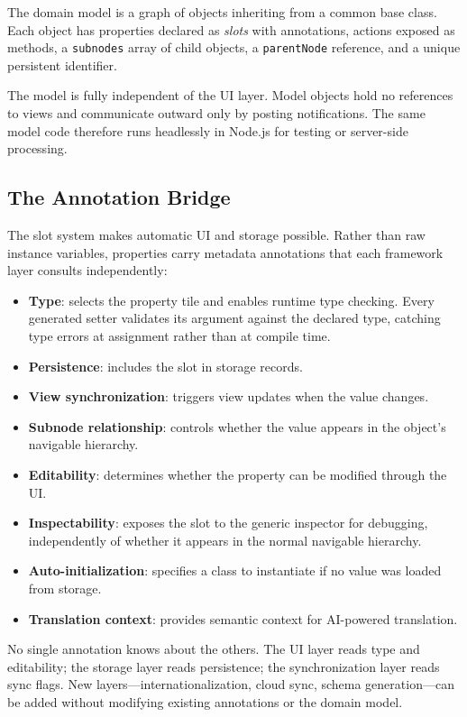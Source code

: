 \documentclass[sigplan,review,anonymous,10pt]{acmart}
\begin{document}
The domain model is a graph of objects inheriting from a common base class. Each object has properties declared as \emph{slots} with annotations, actions exposed as methods, a \texttt{subnodes} array of child objects, a \texttt{parentNode} reference, and a unique persistent identifier.

The model is fully independent of the UI layer. Model objects hold no references to views and communicate outward only by posting notifications. The same model code therefore runs headlessly in Node.js for testing or server-side processing.

\subsection{The Annotation Bridge}
\label{sec:annotation-bridge}

The slot system makes automatic UI and storage possible. Rather than raw instance variables, properties carry metadata annotations that each framework layer consults independently:

\begin{itemize}
\item \textbf{Type}: selects the property tile and enables runtime type checking. Every generated setter validates its argument against the declared type, catching type errors at assignment rather than at compile time.
\item \textbf{Persistence}: includes the slot in storage records.
\item \textbf{View synchronization}: triggers view updates when the value changes.
\item \textbf{Subnode relationship}: controls whether the value appears in the object's navigable hierarchy.
\item \textbf{Editability}: determines whether the property can be modified through the UI.
\item \textbf{Inspectability}: exposes the slot to the generic inspector for debugging, independently of whether it appears in the normal navigable hierarchy.
\item \textbf{Auto-initialization}: specifies a class to instantiate if no value was loaded from storage.
\item \textbf{Translation context}: provides semantic context for AI-powered translation.
\end{itemize}

No single annotation knows about the others. The UI layer reads type and editability; the storage layer reads persistence; the synchronization layer reads sync flags. New layers---internationalization, cloud sync, schema generation---can be added without modifying existing annotations or the domain model.
\end{document}
